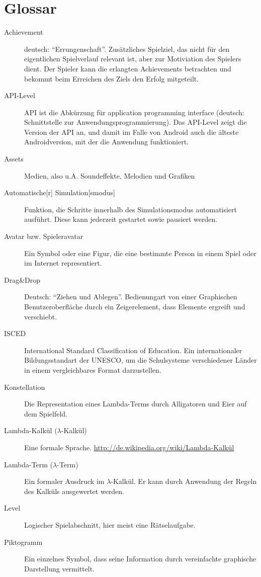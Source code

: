 \section{Glossar}
\begin{description}
	\item[Achievement] deutsch: "`Errungenschaft"'. Zusätzliches Spielziel, das nicht für den eigentlichen Spielverlauf relevant ist, aber zur Motiviation des Spielers dient.
		Der Spieler kann die erlangten Achievements betrachten und bekommt beim Erreichen des Ziels den Erfolg mitgeteilt.
	\item[API-Level] API ist die Abkürzung für application programming interface (deutsch: Schnittstelle zur Anwendungsprogrammierung).
	Das API-Level zeigt die Version der API an, und damit im Falle von Android auch die älteste Androidversion, mit der die Anwendung funktioniert.
	\item[Assets] Medien, also u.A. Soundeffekte, Melodien und Grafiken
	\item[Automatische{[}r{]} Simulation{[}smodus{]}] Funktion, die Schritte innerhalb des Simulationsmodus automatisiert ausführt. Diese kann jederzeit gestartet sowie pausiert werden.
	\item [Avatar bzw. Spieleravatar] Ein Symbol oder eine Figur, die eine bestimmte Person in einem Spiel oder im Internet representiert.
	\item [Drag\&Drop] Deutsch: "`Ziehen und Ablegen"'. Bedienungart von  einer Graphischen Benutzeroberfläche durch ein Zeigerelement, dass Elemente ergreift und verschiebt.
	\item [ISCED] International Standard Classification of Education. Ein internationaler Bildungsstandart der UNESCO, um die Schulsysteme verschiedener Länder in einem vergleichbares Format darzustellen.
	\item [Konstellation] Die Representation eines Lambda-Terms durch Alligatoren und Eier auf dem Spielfeld.
	\item[Lambda-Kalkül (\(\lambda\)-Kalkül)] Eine formale Sprache. \url{http://de.wikipedia.org/wiki/Lambda-Kalkül}
	\item[Lambda-Term (\(\lambda\)-Term)] Ein formaler Ausdruck im \(\lambda\)-Kalkül.
		Er kann durch Anwendung der Regeln des Kalküls ausgewertet werden.
	\item[Level] Logischer Spielabschnitt, hier meist eine Rätselaufgabe.
	\item [Piktogramm] Ein einzelnes Symbol, dass seine Information durch vereinfachte graphische Darstellung vermittelt.

\end{description}
